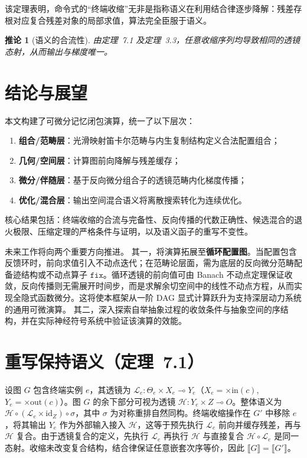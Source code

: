 \documentclass{ctexart}
\newcommand{\bigtimes}{\times}
\newtheorem{corollary}[theorem]{推论}
\newcommand{\lensarrow}{\multimap}
\begin{document}
该定理表明，命令式的“终端收缩”无非是指称语义在利用结合律逐步降解：残差存根对应复合残差对象的局部求值，算法完全臣服于语义。

\begin{corollary}[语义的合流性]
由定理~7.1 及定理~3.3，任意收缩序列均导致相同的透镜态射，从而输出与梯度唯一。
\end{corollary}

\section{结论与展望}

本文构建了可微分记忆闭包演算，统一了以下层次：
\begin{enumerate}
    \item \textbf{组合/范畴层}：光滑映射笛卡尔范畴与内生复制结构定义合法配置组合；
    \item \textbf{几何/空间层}：计算图前向降解与残差缓存；
    \item \textbf{微分/伴随层}：基于反向微分组合子的透镜范畴内化梯度传播；
    \item \textbf{优化/混合层}：输出空间混合语义将离散搜索转化为连续优化。
\end{enumerate}

核心结果包括：终端收缩的合流与完备性、反向传播的代数正确性、候选混合的退火极限、压缩定理的严格条件与证明，以及语义函子的重写不变性。

未来工作将向两个重要方向推进。  
其一，将演算拓展至\textbf{循环配置图}。当配置包含反馈环时，前向求值引入不动点迭代；在范畴论层面，需为底层的反向微分范畴配备迹结构或不动点算子 $\mathtt{fix}$。循环透镜的前向值可由 Banach 不动点定理保证收敛，反向传播则无需展开时间步，而是求解余切空间中的线性不动点方程，从而实现全隐式函数微分。这将使本框架从一阶 DAG 显式计算跃升为支持深层动力系统的通用可微演算。  
其二，深入探索自举抽象过程的收敛条件与抽象空间的序结构，并在实际神经符号系统中验证该演算的效能。

\appendix

\section{重写保持语义（定理~7.1）}

设图 $G$ 包含终端实例 $e$，其透镜为 $\mathcal{L}_e : \Theta_e \times X_e \lensarrow Y_e$（$X_e = \bigtimes \mathrm{in}(c)$, $Y_e = \bigtimes \mathrm{out}(c)$）。图 $G$ 的余下部分可视为透镜 $\mathcal{H} : Y_e \times Z \lensarrow O$。整体语义为 $\mathcal{H} \circ (\mathcal{L}_e \times \mathrm{id}_Z) \circ \sigma$，其中 $\sigma$ 为对称重排自然同构。终端收缩操作在 $G'$ 中移除 $e$，将其输出 $Y_e$ 作为外部输入接入 $\mathcal{H}$，这等于预先执行 $\mathcal{L}_e$ 前向并缓存残差，再与 $\mathcal{H}$ 复合。由于透镜复合的定义，先执行 $\mathcal{L}_e$ 再执行 $\mathcal{H}$ 与直接复合 $\mathcal{H} \circ \mathcal{L}_e$ 是同一态射。收缩未改变复合结构，结合律保证任意嵌套次序等价，因此 $\llbracket G \rrbracket = \llbracket G' \rrbracket$。
\end{document}
